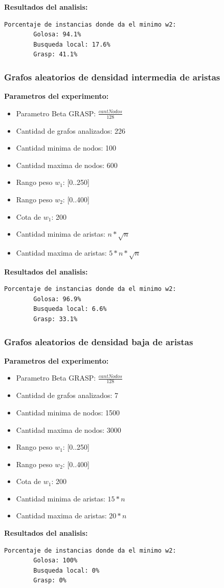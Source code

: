 \textbf{Resultados del analisis:}
\begin{lstlisting}[frame=single]	
	Porcentaje de instancias donde da el minimo w2:
        Golosa: 94.1%
        Busqueda local: 17.6%
        Grasp: 41.1%
\end{lstlisting}

\subsubsection{Grafos aleatorios de densidad intermedia de aristas}
\textbf{Parametros del experimento:}
\begin{itemize}
	\item Parametro Beta GRASP: $\frac{cantNodos}{128}$
	\item Cantidad de grafos analizados: 226
	\item Cantidad minima de nodos: 100
	\item Cantidad maxima de nodos: 600
	\item Rango peso $w_1$: [0..250]
	\item Rango peso $w_2$: [0..400]
	\item Cota de $w_1$: 200
	\item Cantidad minima de aristas: $ n * \sqrt n$
	\item Cantidad maxima de aristas: $ 5 * n * \sqrt n$
\end{itemize}

\textbf{Resultados del analisis:}
\begin{lstlisting}[frame=single]	
	Porcentaje de instancias donde da el minimo w2:
        Golosa: 96.9%
        Busqueda local: 6.6%
        Grasp: 33.1%
\end{lstlisting}

\subsubsection{Grafos aleatorios de densidad baja de aristas}
\textbf{Parametros del experimento:}
\begin{itemize}
	\item Parametro Beta GRASP: $\frac{cantNodos}{128}$
	\item Cantidad de grafos analizados: 7
	\item Cantidad minima de nodos: 1500
	\item Cantidad maxima de nodos: 3000
	\item Rango peso $w_1$: [0..250]
	\item Rango peso $w_2$: [0..400]
	\item Cota de $w_1$: 200
	\item Cantidad minima de aristas: $ 15*n$
	\item Cantidad maxima de aristas: $ 20*n$
\end{itemize}

\textbf{Resultados del analisis:}
\begin{lstlisting}[frame=single]	
	Porcentaje de instancias donde da el minimo w2:
		Golosa: 100%
		Busqueda local: 0%
		Grasp: 0%
\end{lstlisting}
